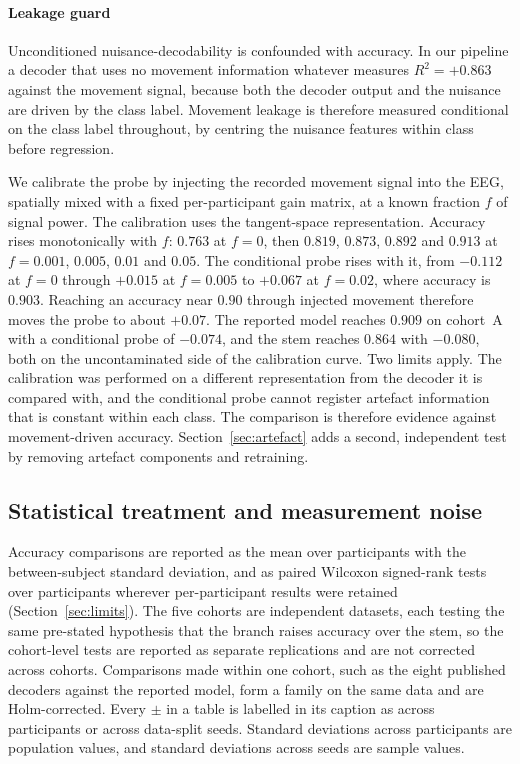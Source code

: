 \documentclass[a4paper,fleqn]{cas-dc}
\begin{document}
\paragraph{Leakage guard} Unconditioned nuisance-decodability is confounded with
accuracy. In our pipeline a decoder that uses no movement information whatever
measures $R^2 = +0.863$ against the movement signal, because both the decoder
output and the nuisance are driven by the class label. Movement leakage is
therefore measured conditional on the class label throughout, by centring the
nuisance features within class before regression.

We calibrate the probe by injecting the recorded movement signal into the EEG,
spatially mixed with a fixed per-participant gain matrix, at a known fraction
$f$ of signal power. The calibration uses the tangent-space representation.
Accuracy rises monotonically with $f$: $0.763$ at $f=0$, then $0.819$, $0.873$,
$0.892$ and $0.913$ at $f = 0.001$, $0.005$, $0.01$ and $0.05$. The conditional
probe rises with it, from $-0.112$ at $f=0$ through $+0.015$ at $f=0.005$ to
$+0.067$ at $f=0.02$, where accuracy is $0.903$. Reaching an accuracy near
$0.90$ through injected movement therefore moves the probe to about $+0.07$.
The reported model reaches $0.909$ on cohort~A with a conditional probe of $-0.074$, and the stem reaches $0.864$ with $-0.080$, both on the uncontaminated side of the calibration curve. Two limits
apply. The calibration was performed on a different representation from the
decoder it is compared with, and the conditional probe cannot register artefact
information that is constant within each class. The comparison is therefore
evidence against movement-driven accuracy. Section~\ref{sec:artefact} adds a
second, independent test by removing artefact components and retraining.

\subsection{Statistical treatment and measurement noise}
\label{sec:noise}

Accuracy comparisons are reported as the mean over participants with
the between-subject standard deviation, and as paired Wilcoxon
signed-rank tests over participants wherever per-participant results
were retained (Section~\ref{sec:limits}). The five cohorts are independent datasets,
each testing the same pre-stated hypothesis that the branch raises accuracy over
the stem, so the cohort-level tests are reported as separate replications and are
not corrected across cohorts. Comparisons made within one cohort, such as the
eight published decoders against the reported model, form a family on the same
data and are Holm-corrected. Every $\pm$ in a table
is labelled in its caption as across participants or across data-split
seeds. Standard deviations across participants are population values,
and standard deviations across seeds are sample values.
\end{document}
